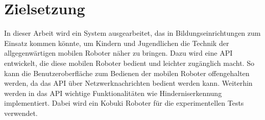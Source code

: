 \section{Zielsetzung} \label{sect:Zielsetzung}
In dieser Arbeit wird ein System ausgearbeitet, das in Bildungseinrichtungen zum Einsatz kommen könnte, um Kindern und Jugendlichen die Technik der allgegenwärtigen mobilen Roboter näher zu bringen. Dazu wird eine API entwickelt, die diese mobilen Roboter bedient und leichter zugänglich macht. So kann die Benutzeroberfläche zum Bedienen der mobilen Roboter offengehalten werden, da das API über Netzwerknachrichten bedient werden kann. Weiterhin werden in das API wichtige Funktionalitäten wie Hinderniserkennung implementiert. Dabei wird ein Kobuki Roboter für die experimentellen Tests verwendet.  